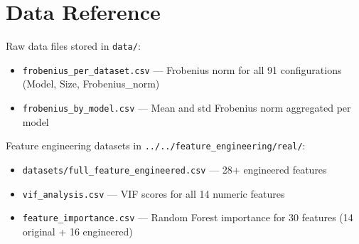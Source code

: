 \documentclass[11pt, a4paper]{report}
\begin{document}
\appendix
\chapter{Data Reference}

Raw data files stored in \texttt{data/}:
\begin{itemize}[nosep]
\item \texttt{frobenius\_per\_dataset.csv} --- Frobenius norm for all 91 configurations (Model, Size, Frobenius\_norm)
\item \texttt{frobenius\_by\_model.csv} --- Mean and std Frobenius norm aggregated per model
\end{itemize}

Feature engineering datasets in \texttt{../../feature\_engineering/real/}:
\begin{itemize}[nosep]
\item \texttt{datasets/full\_feature\_engineered.csv} --- 28+ engineered features
\item \texttt{vif\_analysis.csv} --- VIF scores for all 14 numeric features
\item \texttt{feature\_importance.csv} --- Random Forest importance for 30 features (14 original + 16 engineered)
\end{itemize}
\end{document}
